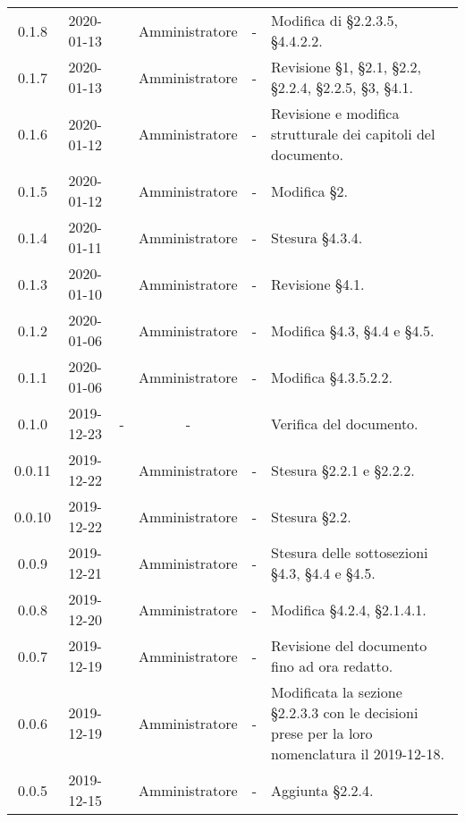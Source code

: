 {\begin{longtable}{ c c  C{2.3cm} c C{3cm} C{3.2cm}}
0.1.8 & 2020-01-13 & \BR{} & Amministratore & - & Modifica di §2.2.3.5, §4.4.2.2. \\

0.1.7 & 2020-01-13 & \AT{} & Amministratore & - & Revisione §1, §2.1, §2.2, §2.2.4, §2.2.5, §3, §4.1. \\

0.1.6 & 2020-01-12 & \MC{} & Amministratore & - & Revisione e modifica strutturale dei capitoli del documento. \\

0.1.5 & 2020-01-12 & \AT{} & Amministratore & - & Modifica §2. \\

0.1.4 & 2020-01-11 & \MC{} & Amministratore & - & Stesura §4.3.4. \\

0.1.3 & 2020-01-10 & \MC{} & Amministratore & - & Revisione §4.1. \\

0.1.2 & 2020-01-06 & \AT{} & Amministratore & - & Modifica §4.3, §4.4 e §4.5. \\

0.1.1 & 2020-01-06 & \AT{} & Amministratore & - & Modifica §4.3.5.2.2. \\

0.1.0 & 2019-12-23 & - & - & \CE{} & Verifica del documento. \\

0.0.11 & 2019-12-22 & \PF{} & Amministratore & - & Stesura §2.2.1 e §2.2.2. \\

0.0.10 & 2019-12-22 & \PF{} & Amministratore & - & Stesura §2.2. \\

0.0.9 & 2019-12-21 & \PF{} & Amministratore & - & Stesura delle sottosezioni §4.3, §4.4 e §4.5. \\

0.0.8 & 2019-12-20 & \MC{} & Amministratore & - & Modifica §4.2.4, §2.1.4.1. \\

0.0.7 & 2019-12-19 & \SE{} & Amministratore & - & Revisione del documento fino ad ora redatto. \\

0.0.6 & 2019-12-19 & \CE{} & Amministratore & - & Modificata la sezione §2.2.3.3 con le decisioni prese per la loro nomenclatura il 2019-12-18. \\

0.0.5 & 2019-12-15 & \SE{} & Amministratore & - & Aggiunta §2.2.4. \\


\end{longtable}}
